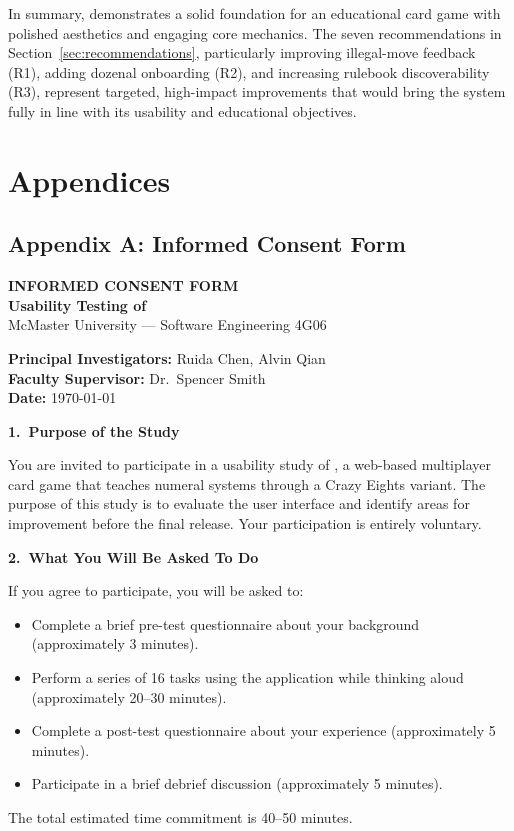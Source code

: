 \documentclass[12pt, titlepage]{article}
\begin{document}
\noindent In summary, \progname{} demonstrates a solid foundation for an educational card game with polished aesthetics and engaging core mechanics. The seven recommendations in Section~\ref{sec:recommendations}, particularly improving illegal-move feedback (R1), adding dozenal onboarding (R2), and increasing rulebook discoverability (R3), represent targeted, high-impact improvements that would bring the system fully in line with its usability and educational objectives.


\newpage
\section{Appendices}\label{sec:appendices}

\subsection{Appendix A: Informed Consent Form}

\begin{center}
\textbf{INFORMED CONSENT FORM} \\[6pt]
\textbf{Usability Testing of \progname{}} \\[4pt]
McMaster University --- Software Engineering 4G06
\end{center}

\noindent\textbf{Principal Investigators:} Ruida Chen, Alvin Qian \\
\textbf{Faculty Supervisor:} Dr.\ Spencer Smith \\
\textbf{Date:} \today

\bigskip

\noindent\textbf{1.\ Purpose of the Study}

You are invited to participate in a usability study of \progname{}, a web-based multiplayer card game that teaches numeral systems through a Crazy Eights variant. The purpose of this study is to evaluate the user interface and identify areas for improvement before the final release. Your participation is entirely voluntary.

\bigskip

\noindent\textbf{2.\ What You Will Be Asked To Do}

If you agree to participate, you will be asked to:
\begin{itemize}
  \item Complete a brief pre-test questionnaire about your background (approximately 3 minutes).
  \item Perform a series of 16 tasks using the \progname{} application while thinking aloud (approximately 20--30 minutes).
  \item Complete a post-test questionnaire about your experience (approximately 5 minutes).
  \item Participate in a brief debrief discussion (approximately 5 minutes).
\end{itemize}
The total estimated time commitment is 40--50 minutes.
\end{document}
